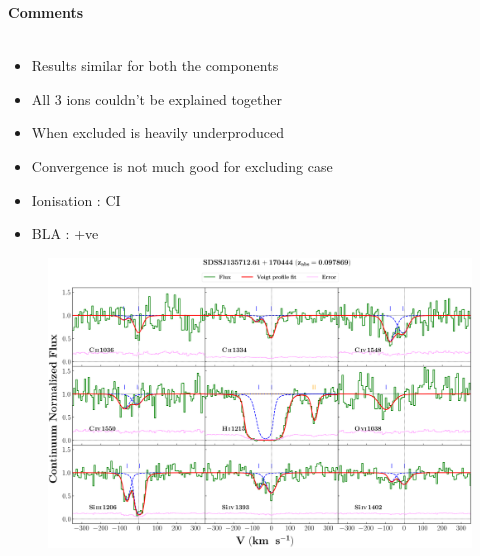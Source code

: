 \documentclass[12pt]{report}
\newcommand\ion[2]{\text{#1\,\textsc{\lowercase{#2}}}}
\begin{document}
\newpage

\textbf{Comments}
\\\\
\begin{itemize}
    \item Results similar for both the components
    \item All 3 ions couldn't be explained together
    \item When excluded \ion{O}{vi} is heavily underproduced
    \item Convergence is not much good for excluding \ion{O}{vi} case
    \item Ionisation : CI
    \item BLA : +ve
\end{itemize}


\newpage

\begin{landscape}

\begin{figure}
    \centering
    \vspace{-20mm}
    \hspace*{-35mm}
    \includegraphics[width=1.25\linewidth]{System-Plots/SDSSJ135712.61+170444_z=0.097869_sys_plot.png}
\end{figure}

\end{landscape}
\end{document}
